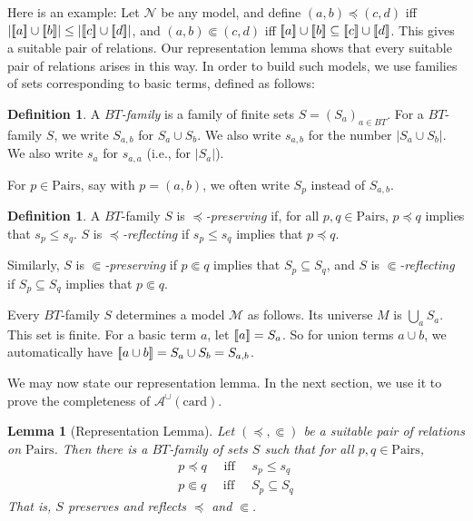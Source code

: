 \documentclass[letterpaper]{article} %
\newtheorem{lemma}[theorem]{Lemma}
\theoremstyle{definition}
\newtheorem{definition}[theorem]{Definition}
\newcommand{\semantics}[1]{[\![\mbox{\em $ #1 $\/}]\!]}
\newcommand{\Model}{\mathcal{M}}
\newcommand{\Nodel}{\mathcal{N}}
\newcommand{\quadiff}{\quad \mbox{ iff } \quad}
\newcommand{\Aunion}{\mathscr{A}^{\cup}}
\newcommand{\card}{\mathrm{card}}
\newcommand{\Pairs}{\mbox{Pairs}}
\newcommand{\precsubseteq}{\Subset}
\newcommand{\suitable}{suitable}%
\begin{document}
Here is an example:
Let $\Nodel$ be any model, and define $(a,b) \preceq (c,d)$ iff 
$|\semantics{a} \cup \semantics{b}| \leq
|\semantics{c} \cup \semantics{d}|$, and 
 $(a,b) \precsubseteq (c,d)$ iff 
$\semantics{a} \cup \semantics{b} \subseteq
\semantics{c} \cup \semantics{d}$.
This gives a {\suitable} pair of relations.
Our representation lemma shows that every {\suitable} pair of relations arises in
this way.  In order to build such models, we use families of sets corresponding to basic terms, defined as follows:

\begin{definition}
 A \emph{$BT$-family} is a family of finite sets
$S = (S_a)_{a\in BT}$.
For a $BT$-family $S$, we write $S_{a,b}$ for $S_a \cup S_b$.  We also write $s_{a,b}$
for the number  $|S_a\cup S_b|$.  
We also write $s_a$ for $s_{a,a}$ (i.e., for $|S_a|$).

For $p\in\Pairs$, say with $p= (a,b)$, we often write $S_p$ instead of $S_{a,b}$.
\end{definition}

\begin{definition}\label{def-family-model}
A $BT$-family $S$ is \emph{$\preceq$-preserving} if, for all $p,q \in \Pairs$, $p \preceq q$ implies that $s_{p} \le s_{q}$.  $S$ is \emph{$\preceq$-reflecting} if $s_{p} \le s_{q}$ implies that $p \preceq q$.

Similarly, $S$ is \emph{$\precsubseteq$-preserving}
if $p \precsubseteq q$ implies that $S_{p} \subseteq S_{q}$, and 
$S$ is \emph{$\precsubseteq$-reflecting} if 
$S_{p} \subseteq S_{q}$ implies that $p \precsubseteq  q$. 

Every $BT$-family $S$ determines
a  model $\Model$ as follows.  Its universe $M$ is  $\bigcup_{a} S_a$.
This set is finite.
For a basic term  $a$, let $\semantics{a} = S_{a}$. 
So  for union terms $a\cup b$, we
automatically
have $\semantics{a\cup b} = S_{a} \cup S_{b} = S_{a,b}$.
\end{definition}

We may now state our representation lemma.  In the next section, we use it to prove the completeness of $\Aunion(\card)$.

\begin{lemma} [Representation Lemma]
Let $(\preceq, \precsubseteq)$ be a suitable pair of relations on $\Pairs$.
Then there is a $BT$-family of sets $S$
such that for all $p,q\in\Pairs$,
\begin{align}
\label{goal-main1-first}
p \preceq q \quadiff 
 s_{p}\leq s_q  \\
\label{goal-main2-first} 
 p \precsubseteq  q \quadiff 
S_{p}\subseteq S_{q}
 \end{align}
 That is, $S$ preserves and reflects $\preceq$ and $\precsubseteq$.
 \label{lemma-representation}
 \end{lemma}
\end{document}
